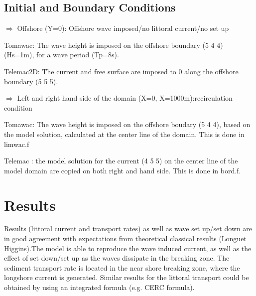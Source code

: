 %
%
\subsection{Initial and Boundary Conditions}
%
$\Rightarrow $ Offshore (Y=0): Offshore wave imposed/no littoral current/no set up 

Tomawac:
The wave height is imposed on the offshore boundary (5 4 4) (Hs=1m), for a wave period (Tp=8s).

Telemac2D:
The current and free surface are imposed to 0 along the offshore boundary (5 5 5).

$\Rightarrow $ Left and right hand side of the domain (X=0, X=1000m):recirculation condition 

Tomawac:
The wave height is imposed on the offshore boudary (5 4 4), based on the model solution, calculated  at the center line of the domain.  This is done in limwac.f 

Telemac :
the model solution for the current (4 5 5) on the center line of the model domain are copied on both right and hand side. This is done in bord.f.

%
%
%
%

%
%
\section{Results}
%
Results (littoral current and transport rates) as well as wave set up/set down are in good agreement with
expectations from theoretical classical results (Longuet Higgins).The model is able to reproduce the wave
induced current, as well as the effect of set down/set up as the waves dissipate in the breaking zone.
The sediment transport rate is located in the near shore breaking zone, where the longshore current is
generated.
Similar results for the littoral transport could be obtained by using an integrated formula (e.g. CERC formula).

